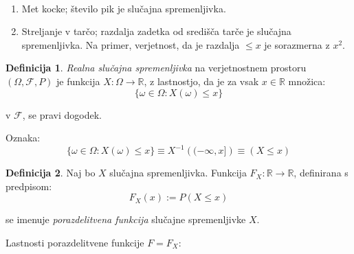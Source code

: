\documentclass[12pt]{book}
\def\n{\noindent}
\theoremstyle{definition}
\newtheorem{definicija}{Definicija}
\theoremstyle{plain}
\theoremstyle{plain}
\theoremstyle{plain}
\theoremstyle{remark}
\begin{document}
\begin{zgled}
    ~

    \begin{enumerate} 
        \item Met kocke; število pik je slučajna spremenljivka.
        \item Streljanje v tarčo; razdalja zadetka od središča tarče je slučajna spremenljivka. 
        Na primer, verjetnost, da je razdalja $\leq x$ je sorazmerna z $x^2$.
    \end{enumerate}
\end{zgled}

\begin{definicija}
    \emph{Realna slučajna spremenljivka} na verjetnostnem prostoru $(\Omega, \mathcal{F}, P)$ je funkcija $X: \Omega \to \mathbb{R}$, z lastnostjo, da je za vsak $x \in \mathbb{R}$ množica:
    $$
    \{\omega \in \Omega: X(\omega) \leq x\}
    $$

    v $\mathcal{F}$, se pravi dogodek.
\end{definicija}

\n Oznaka: 
$$
\{\omega \in \Omega: X(\omega) \leq x\} \equiv X^{-1}\left((-\infty, x]\right) \equiv (X \leq x)
$$

\begin{definicija}
    Naj bo $X$ slučajna spremenljivka. Funkcija $F_X: \mathbb{R} \to \mathbb{R}$, definirana s predpisom: 
    $$
    F_X(x):=P(X \leq x)
    $$

    se imenuje \emph{porazdelitvena funkcija} slučajne spremenljivke $X$.
\end{definicija}

\newpage

\n Lastnosti porazdelitvene funkcije $F=F_X$:
\end{document}
